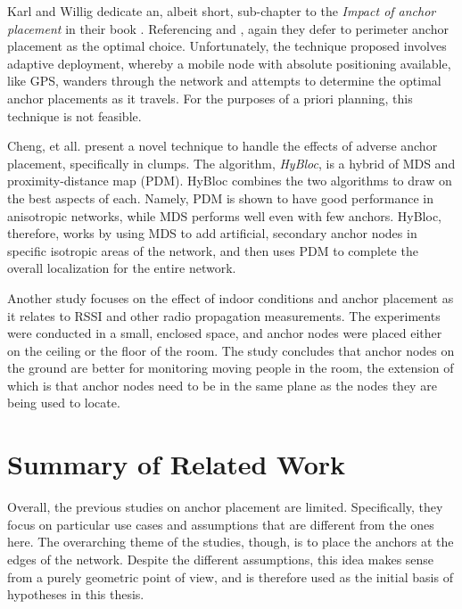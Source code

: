 Karl and Willig dedicate an, albeit short, sub-chapter to the \emph{Impact of anchor placement} in their book \cite[p. 247-248]{Karl}.  Referencing \cite{Doherty} and \cite{Savarese}, again they defer to perimeter anchor placement as the optimal choice.  Unfortunately, the technique proposed involves adaptive deployment, whereby a mobile node with absolute positioning available, like GPS, wanders through the network and attempts to determine the optimal anchor placements as it travels.  For the purposes of a priori planning, this technique is not feasible.

Cheng, et all.\cite{Cheng} present a novel technique to handle the effects of adverse anchor placement, specifically in clumps.  The algorithm, \emph{HyBloc}, is a hybrid of MDS and proximity-distance map (PDM)\cite{PDM}.  HyBloc combines the two algorithms to draw on the best aspects of each. Namely, PDM is shown to have good performance in anisotropic networks, while MDS performs well even with few anchors.  HyBloc, therefore, works by using MDS to add artificial, secondary anchor nodes in specific isotropic areas of the network, and then uses PDM to complete the overall localization for the entire network.

Another study focuses on the effect of indoor conditions and anchor placement as it relates to RSSI and other radio propagation measurements\cite{Zemek}.  The experiments were conducted in a small, enclosed space, and anchor nodes were placed either on the ceiling or the floor of the room.  The study concludes that anchor nodes on the ground are better for monitoring moving people in the room, the extension of which is that anchor nodes need to be in the same plane as the nodes they are being used to locate.

\section{Summary of Related Work}

Overall, the previous studies on anchor placement are limited.  Specifically, they focus on particular use cases and assumptions that are different from the ones here. The overarching theme of the studies, though, is to place the anchors at the edges of the network.  Despite the different assumptions, this idea makes sense from a purely geometric point of view, and is therefore used as the initial basis of hypotheses in this thesis.

